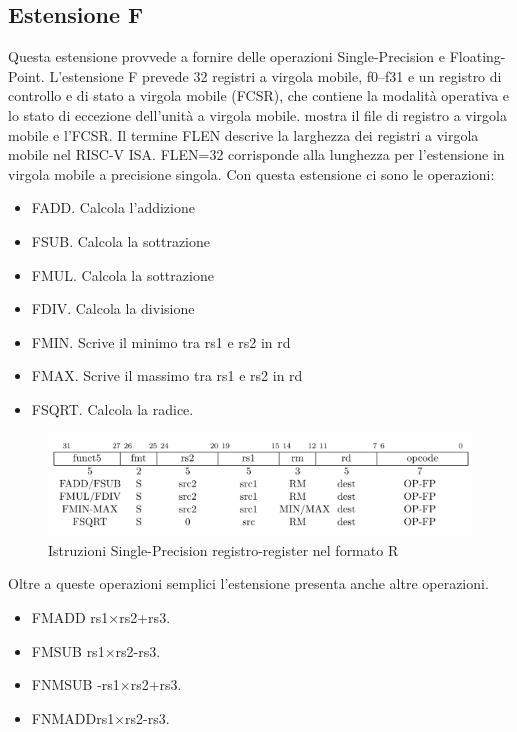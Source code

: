 \documentclass[12pt,a4paper]{report}
\begin{document}
\subsection{Estensione F}
Questa estensione provvede a fornire delle operazioni Single-Precision e Floating-Point.
L'estensione F prevede 32 registri a virgola mobile, f0–f31 e un registro di controllo e di stato a virgola mobile (FCSR), che contiene la modalità operativa e lo stato di eccezione dell'unità a virgola mobile.  mostra il file di registro a virgola mobile e l'FCSR. Il termine FLEN descrive la larghezza dei registri a virgola mobile nel RISC-V ISA. FLEN=32 corrisponde alla lunghezza per l'estensione in virgola mobile a precisione singola.
Con questa estensione ci sono le operazioni:
\begin{itemize}
\item FADD. Calcola l'addizione
\item FSUB. Calcola la sottrazione
\item FMUL. Calcola la sottrazione
\item FDIV. Calcola la divisione
\item FMIN. Scrive il minimo tra rs1 e rs2 in rd
\item FMAX. Scrive il massimo tra rs1 e rs2 in rd
\item FSQRT. Calcola la radice.
\end{itemize}

\begin{figure}
	\includegraphics[width = \textwidth]{Istruzioni/IstruzioniF/Istruction1_F.png}
	\caption{Istruzioni Single-Precision registro-register nel formato R }
	\label{Fig:Istruzioni_SP-FormatoR}
\end{figure}

Oltre a queste operazioni semplici l'estensione presenta anche altre operazioni.
\begin{itemize}
	\item FMADD rs1×rs2+rs3.
	\item FMSUB rs1×rs2-rs3.
	\item FNMSUB -rs1×rs2+rs3. 
	\item FNMADDrs1×rs2-rs3.

\end{itemize}
\end{document}
